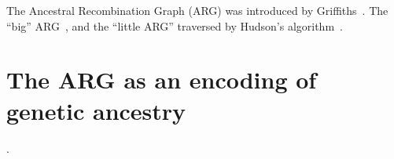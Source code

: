 \documentclass{article}
\begin{document}
The Ancestral Recombination Graph (ARG) was introduced by
Griffiths~\citep{griffiths1991two,griffiths1997ancestral}.
The ``big'' ARG~\citep{ethier1990two},
and the ``little ARG'' traversed by
Hudson's algorithm~\citep{hudson1983properties}.

\section*{The ARG as an encoding of genetic ancestry}

\citep[e.g.][]{minichiello2006mapping,mathieson2020ancestry}.




\end{document}
